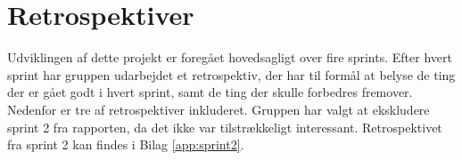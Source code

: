 \section{Retrospektiver}\label{sec:brugafscrum}
Udviklingen af dette projekt er foregået hovedsagligt over fire sprints. Efter hvert sprint har gruppen udarbejdet
et retrospektiv, der har til formål at belyse de ting der er gået godt i hvert sprint, samt de ting der skulle forbedres fremover.
Nedenfor er tre af retrospektiver inkluderet. Gruppen har valgt at ekskludere sprint 2 fra rapporten, da det ikke var tilstrækkeligt interessant.
Retrospektivet fra sprint 2 kan findes i Bilag \ref{app:sprint2}.





